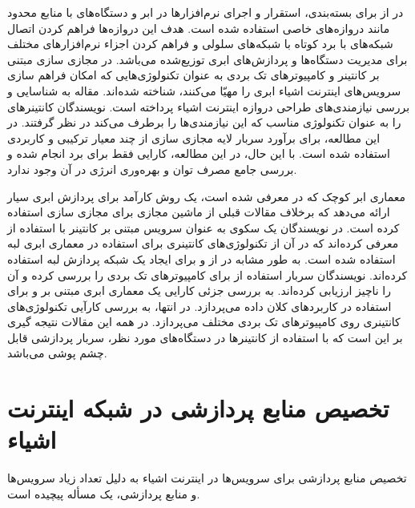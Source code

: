     در \cite{novo2015capillary} از  برای بسته‌بندی، استقرار و اجرای نرم‌افزار‌ها در ابر و دستگاه‌های با منابع محدود مانند دروازه‌های خاصی استفاده شده است.
    هدف این دروازه‌ها فراهم کردن اتصال شبکه‌های با برد کوتاه با شبکه‌های سلولی و فراهم کردن اجزاء نرم‌افزار‌های مختلف برای مدیریت دستگاه‌ها و پردازش‌های ابری توزیع‌شده می‌باشد.
    در \cite{celesti2016exploring} مجازی سازی مبتنی بر کانتینر و کامپیوتر‌های تک بردی به عنوان تکنولوژی‌هایی که امکان فراهم سازی سرویس‌های اینترنت اشیاء ابری را مهیّا می‌کنند، شناخته شده‌اند.
    مقاله \cite{krylovskiy2015internet} به شناسایی و بررسی نیازمندی‌های طراحی دروازه اینترنت اشیاء پرداخته است.
    نویسندگان کانتینر‌های  را به عنوان تکنولوژی مناسب که این نیازمندی‌ها را برطرف می‌کند در نظر گرفتند.
    در این مطالعه، برای برآورد سربار لایه مجازی سازی از چند معیار ترکیبی و کاربردی استفاده شده است.
    با این حال، در این مطالعه، کارایی فقط برای برد  انجام شده و بررسی جامع مصرف توان و بهره‌وری انرژی در آن وجود ندارد.

    معماری ابر کوچک که در \cite{satyanarayanan2009case} معرفی شده است، یک روش کارآمد برای پردازش ابری سیار ارائه می‌دهد که برخلاف مقالات قبلی از ماشین مجازی برای مجازی سازی استفاده کرده است.
    در \cite{pahl2016container} نویسندگان یک سکوی به عنوان سرویس مبتنی بر کانتینر با استفاده از  معرفی کرده‌اند که در آن از تکنولوژی‌های کانتینری برای استفاده در معماری ابری لبه استفاده شده است.
    به طور مشابه در \cite{bellavista2017feasibility} از  و  برای ایجاد یک شبکه پردازش لبه استفاده کرده‌اند.
    نویسندگان سربار استفاده از  برای کامپیوتر‌های تک بردی را بررسی کرده و آن را ناچیز ارزیابی کرده‌اند.
    \cite{hajji2016understanding} به بررسی جزئی کارایی یک معماری ابری مبتنی بر  و  برای استفاده در کاربرد‌های کلان داده می‌پردازد.
    در انتها، \cite{morabito2017virtualization} به بررسی کارآیی تکنولوژی‌های کانتینری روی کامپیوتر‌های تک بردی مختلف می‌پردازد.
    در همه این مقالات نتیجه گیری بر این است که با استفاده از کانتینر‌ها در دستگاه‌های مورد نظر، سربار پردازشی قابل چشم پوشی می‌باشد.

  \section{تخصیص منابع پردازشی در شبکه اینترنت اشیاء}
    تخصیص منابع پردازشی برای سرویس‌ها در اینترنت اشیاء به دلیل تعداد زیاد سرویس‌ها و منابع پردازشی، یک مسأله پیچیده است.

